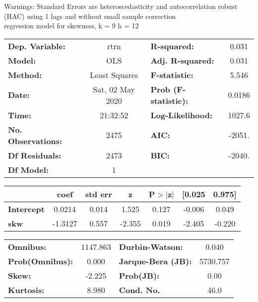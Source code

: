 Warnings: \newline
 [1] Standard Errors are heteroscedasticity and autocorrelation robust (HAC) using 1 lags and without small sample correction\\ 

regression model for skewness, k = 9 h = 12\begin{center}
\begin{tabular}{lclc}
\toprule
\textbf{Dep. Variable:}    &       rtrn       & \textbf{  R-squared:         } &     0.031   \\
\textbf{Model:}            &       OLS        & \textbf{  Adj. R-squared:    } &     0.031   \\
\textbf{Method:}           &  Least Squares   & \textbf{  F-statistic:       } &     5.546   \\
\textbf{Date:}             & Sat, 02 May 2020 & \textbf{  Prob (F-statistic):} &   0.0186    \\
\textbf{Time:}             &     21:32:52     & \textbf{  Log-Likelihood:    } &    1027.6   \\
\textbf{No. Observations:} &        2475      & \textbf{  AIC:               } &    -2051.   \\
\textbf{Df Residuals:}     &        2473      & \textbf{  BIC:               } &    -2040.   \\
\textbf{Df Model:}         &           1      & \textbf{                     } &             \\
\bottomrule
\end{tabular}
\begin{tabular}{lcccccc}
                   & \textbf{coef} & \textbf{std err} & \textbf{z} & \textbf{P$> |$z$|$} & \textbf{[0.025} & \textbf{0.975]}  \\
\midrule
\textbf{Intercept} &       0.0214  &        0.014     &     1.525  &         0.127        &       -0.006    &        0.049     \\
\textbf{skw}       &      -1.3127  &        0.557     &    -2.355  &         0.019        &       -2.405    &       -0.220     \\
\bottomrule
\end{tabular}
\begin{tabular}{lclc}
\textbf{Omnibus:}       & 1147.863 & \textbf{  Durbin-Watson:     } &    0.040  \\
\textbf{Prob(Omnibus):} &   0.000  & \textbf{  Jarque-Bera (JB):  } & 5730.757  \\
\textbf{Skew:}          &  -2.225  & \textbf{  Prob(JB):          } &     0.00  \\
\textbf{Kurtosis:}      &   8.980  & \textbf{  Cond. No.          } &     46.0  \\
\bottomrule
\end{tabular}
\end{center}

